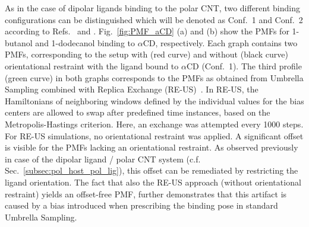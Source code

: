 \documentclass[9pt,lessons]{livecoms}
\begin{document}
As in the case of dipolar ligands binding to the polar CNT, two different binding configurations can be distinguished which will be denoted as Conf.~1 and Conf.~2 according to Refs.~ and .
Fig.~\ref{fig:PMF_aCD} (a) and (b) show the PMFs for 1-butanol and 1-dodecanol binding to $\alpha$CD, respectively. 
Each graph contains two PMFs, corresponding to the setup with (red curve) and without (black curve) orientational restraint with the ligand bound to $\alpha$CD (Conf.~1).
The third profile (green curve) in both graphs corresponds to the PMFs as obtained from Umbrella Sampling combined with Replica Exchange (RE-US)~\cite{sugita2000multidimensional}. 
In RE-US, the Hamiltonians of neighboring windows defined by the individual values for the bias centers are allowed to swap after predefined time instances, based on the Metropolis-Hastings criterion. 
Here, an exchange was attempted every 1000 steps.  
For RE-US simulations, no orientational restraint was applied. 
A significant offset is visible for the PMFs lacking an orientational restraint. 
As observed previously in case of the dipolar ligand / polar CNT system (c.f. Sec.~\ref{subsec:pol_host_pol_lig}), this offset can be remediated by restricting the ligand orientation.
The fact that also the RE-US approach (without orientational restraint) yields an offset-free PMF, further demonstrates that this artifact is caused by a bias introduced when prescribing the binding pose in standard Umbrella Sampling.
\end{document}
